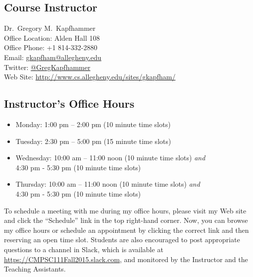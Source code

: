 

\usepackage[compact]{titlesec}



\vspace*{-.1in}
\subsection*{Course Instructor}
Dr.\ Gregory M.\ Kapfhammer\\
\noindent Office Location: Alden Hall 108 \\
\noindent Office Phone: +1 814-332-2880 \\
\noindent Email: \url{gkapfham@allegheny.edu} \\
\noindent Twitter: \url{@GregKapfhammer} \\
\noindent Web Site: \url{http://www.cs.allegheny.edu/sites/gkapfham/}

\subsection*{Instructor's Office Hours}

\begin{itemize}
  \itemsep 0em
  \item Monday: 1:00 pm -- 2:00 pm (10 minute time slots)
  \item Tuesday: 2:30 pm -- 5:00 pm (15 minute time slots)
  \item Wednesday: 10:00 am -- 11:00 noon (10 minute time slots) {\em and} \\ \hspace*{.8in}
    4:30 pm - 5:30 pm (10 minute time slots)
  \item Thursday: 10:00 am -- 11:00 noon (10 minute time slots) {\em and} \\ \hspace*{.8in}
    4:30 pm - 5:30 pm (10 minute time slots)
\end{itemize}

\vspace*{-.1in}

\noindent To schedule a meeting with me during my office hours, please visit my Web site and click the ``Schedule'' link
in the top right-hand corner. Now, you can browse my office hours or schedule an appointment by clicking the correct
link and then reserving an open time slot. Students are also encouraged to post appropriate questions to a channel in
Slack, which is available at \url{https://CMPSC111Fall2015.slack.com}, and monitored by the Instructor and the Teaching
Assistants.

